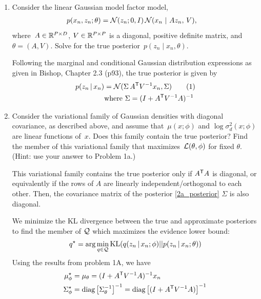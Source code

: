 \documentclass[11pt]{article}
\newcommand{\inv}{{-1}}
\newcommand{\numberthis}{\addtocounter{equation}{1}\tag{\theequation}}
\begin{document}
\begin{enumerate}[label=(\alph*)]
    \item Consider the linear Gaussian model factor model,
    \begin{align*}
        p(x_n, z_n; \theta) &= \mathcal{N}(z_n; 0, I) \, \mathcal{N}(x_n ~\vert~ A z_n, \, V),
    \end{align*}
    where~$A \in \mathbb{R}^{P \times D}$, $V \in \mathbb{R}^{P \times P}$ is a diagonal, positive definite matrix, and~$\theta = (A, V)$.  Solve for the true posterior~$p(z_n \mid x_n, \theta)$.
    
    \begin{solution}
    Following the marginal and conditional Gaussian distribution expressions as given in Bishop, Chapter 2.3 (p93), the true posterior is given by
    \begin{align*}
        p(z_n \given x_n) &= \cN(\Sigma\, A^\trans V^\inv x_n, \Sigma)
        \numberthis\label{2a_posterior}\\
        & \textrm{where } \Sigma = (I + A^\trans V^\inv A)^\inv
    \end{align*}
    \end{solution}
    
    \item  Consider the variational family of Gaussian densities with diagonal covariance, as described above, and assume that~$\mu(x; \phi)$ and $\log \sigma_d^2(x; \phi)$ are linear functions of~$x$.  Does this family contain the true posterior?  Find the member of this variational family that maximizes~$\mathcal{L}(\theta, \phi)$ for fixed $\theta$. (Hint: use your answer to Problem 1a.)
    
    \begin{solution}
    This variational family contains the true posterior only if $A^{\mathsf{T}} A$ is diagonal, or equivalently if the rows of $A$ are linearly independent/orthogonal to each other. Then, the covariance matrix of the posterior \eqref{2a_posterior} $\Sigma$ is also diagonal.

    We minimize the KL divergence between the true and approximate posteriors to find the member of $\mathcal{Q}$ which maximizes the evidence lower bound:
    \begin{align*}
        q^\star = \arg\min_{q\in\mathcal{Q}}\textrm{KL}(q(z_n\,|\, x_n; \phi) || p(z_n \,|\, x_n; \theta))
    \end{align*}
    Using the results from problem 1A, we have
    \begin{align*}
        \mu_\phi^\star &= \mu_\theta = (I + A^\trans V^\inv A)^\inv x_n \\
        \Sigma_\phi^\star &= \textrm{diag}\left[\Sigma_\theta^\inv\right]^\inv
        = \textrm{diag}\left[(I + A^\trans V^\inv A)\right]^\inv
    \end{align*}
    \end{solution}
    

\end{enumerate}
\end{document}
